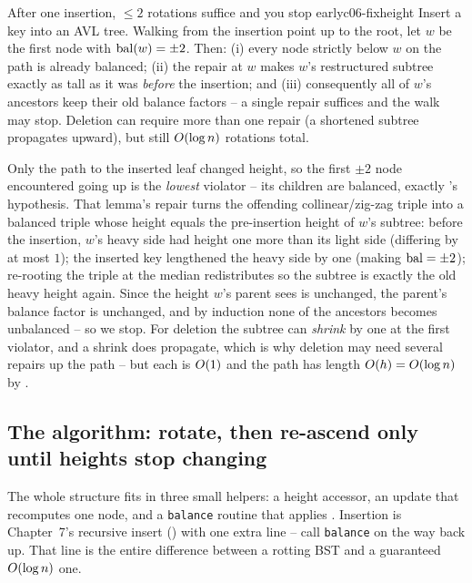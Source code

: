 \begin{theorem}{After one insertion, $\le 2$ rotations suffice and you stop early}{c06-fixheight}
Insert a key into an AVL tree. Walking from the insertion point up to the root, let $w$ be the first node
with $\operatorname{bal}(w)=\pm 2$. Then: (i) every node strictly below $w$ on the path is already balanced; (ii) the
 repair at $w$ makes $w$'s restructured subtree exactly as tall as it was
\emph{before} the insertion; and (iii) consequently all of $w$'s ancestors keep their old balance factors
-- a single repair suffices and the walk may stop. Deletion can require more than one repair (a
shortened subtree propagates upward), but still $O(\log n)$ rotations total.
\end{theorem}
\begin{proofbox}
Only the path to the inserted leaf changed height, so the first $\pm2$ node encountered going up is the
\emph{lowest} violator -- its children are balanced, exactly 's hypothesis. That
lemma's repair turns the offending collinear/zig-zag triple into a balanced triple whose height equals
the pre-insertion height of $w$'s subtree: before the insertion, $w$'s heavy side had height one more
than its light side (differing by at most $1$); the inserted key lengthened the heavy side by one (making
$\operatorname{bal}=\pm2$); re-rooting the triple at the median redistributes so the subtree is exactly the old heavy
height again. Since the height $w$'s parent sees is unchanged, the parent's balance factor is unchanged,
and by induction none of the ancestors becomes unbalanced -- so we stop. For deletion the subtree can
\emph{shrink} by one at the first violator, and a shrink does propagate, which is why deletion may need
several repairs up the path -- but each is $O(1)$ and the path has length $O(h)=O(\log n)$ by
. \end{proofbox}

\subsection{The algorithm: rotate, then re-ascend only until heights stop changing}

The whole structure fits in three small helpers: a height accessor, an update that recomputes one node,
and a \texttt{balance} routine that applies . Insertion is Chapter~7's recursive
insert () with one extra line -- call \texttt{balance} on the way back up. That
line is the entire difference between a rotting BST and a guaranteed $O(\log n)$ one.

